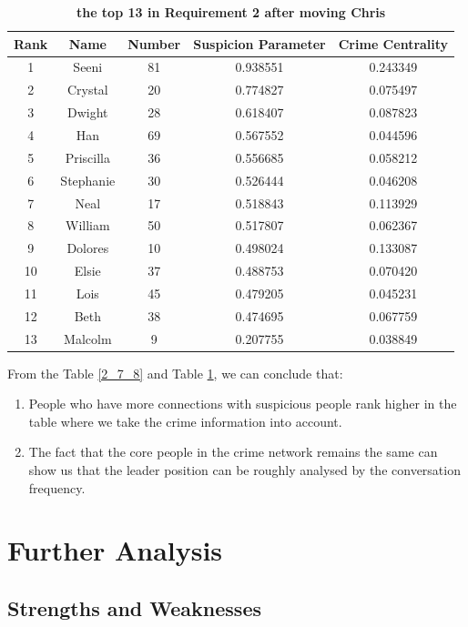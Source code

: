\documentclass[12pt]{article}
\begin{document}
\begin{table}[!htb]
\centering
{}
\begin{tabular}{c|c|c|c|c}
\toprule[2pt] 
\textbf{Rank} & \textbf{Name} & \textbf{Number} & \textbf{Suspicion Parameter} & \textbf{Crime Centrality} \\
\hline
1 & Seeni & 81 & 0.938551 & 0.243349 \\
2 & Crystal & 20 & 0.774827 & 0.075497 \\
3 & Dwight & 28 & 0.618407 & 0.087823 \\
4 & Han & 69 & 0.567552 & 0.044596 \\
5 & Priscilla & 36 & 0.556685 & 0.058212 \\
6 & Stephanie & 30 & 0.526444 & 0.046208 \\
7 & Neal & 17 & 0.518843 & 0.113929 \\
8 & William & 50 & 0.517807 & 0.062367 \\
9 & Dolores & 10 & 0.498024 & 0.133087 \\
10 & Elsie & 37 & 0.488753 & 0.070420 \\
11 & Lois & 45 & 0.479205 & 0.045231 \\
12 & Beth & 38 & 0.474695 & 0.067759 \\ 
13 & Malcolm & 9 & 0.207755 & 0.038849 \\
\hline
\end{tabular}
\caption{\textbf{the top 13 in Requirement 2 after moving Chris}}
\label{2_8_7}
\end{table}

From the Table \ref{2_7_8} and Table \ref{2_8_7}, we can conclude that:
\begin{enumerate}
\item People who have more connections with suspicious people rank higher in the table where we take the crime information into account.
\item The fact that the core people in the crime network remains the same can show us that the leader position can be roughly analysed by the conversation frequency.
\end{enumerate}

\section{Further Analysis}
\subsection{Strengths and Weaknesses}
\end{document}
